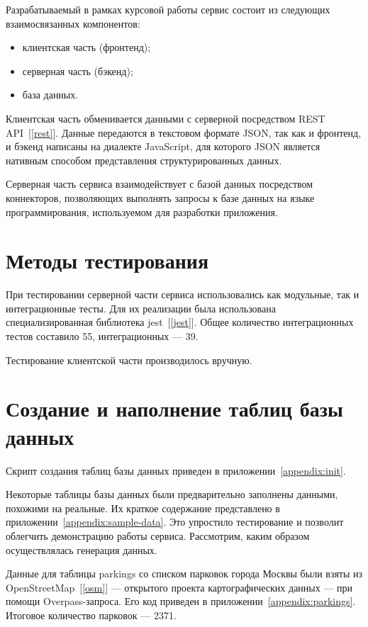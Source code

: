 Разрабатываемый в рамках курсовой работы сервис состоит из следующих взаимосвязанных компонентов:

\begin{itemize}
    \item клиентская часть (фронтенд);
    \item серверная часть (бэкенд);
    \item база данных.
\end{itemize}

Клиентская часть обменивается данными с серверной посредством REST API~[\ref{rest}]. Данные передаются в текстовом формате JSON, так как и фронтенд, и бэкенд написаны на диалекте JavaScript, для которого JSON является нативным способом представления структурированных данных.

Серверная часть сервиса взаимодействует с базой данных посредством коннекторов, позволяющих выполнять запросы к базе данных на языке программирования, используемом для разработки приложения.

\section{Методы тестирования}

При тестировании серверной части сервиса использовались как модульные, так и интеграционные тесты. Для их реализации была использована специализированная библиотека jest~[\ref{jest}]. Общее количество интеграционных тестов составило 55, интеграционных --- 39.

Тестирование клиентской части производилось вручную.

\section{Создание и наполнение таблиц базы данных}

Скрипт создания таблиц базы данных приведен в приложении~\ref{appendix:init}.

Некоторые таблицы базы данных были предварительно заполнены данными, похожими на реальные. Их краткое содержание представлено в приложении~\ref{appendix:sample-data}. Это упростило тестирование и позволит облегчить демонстрацию работы сервиса. Рассмотрим, каким образом осуществлялась генерация данных.

Данные для таблицы parkings со списком парковок города Москвы были взяты из OpenStreetMap~[\ref{osm}] --- открытого проекта картографических данных --- при помощи Overpass-запроса. Его код приведен в приложении~\ref{appendix:parkings}. Итоговое количество парковок --- 2371.

